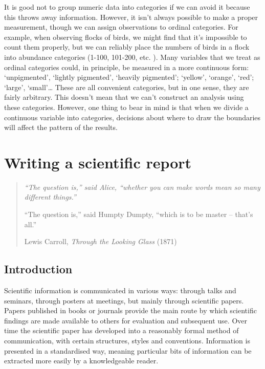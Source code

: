 \documentclass[
]{book}
\begin{document}
It is good not to group numeric data into categories if we can avoid it because this throws away information. However, it isn't always possible to make a proper measurement, though we can assign observations to ordinal categories. For example, when observing flocks of birds, we might find that it's impossible to count them properly, but we can reliably place the numbers of birds in a flock into abundance categories (1-100, 101-200, etc. ). Many variables that we treat as ordinal categories could, in principle, be measured in a more continuous form: `unpigmented', `lightly pigmented', `heavily pigmented'; `yellow', `orange', `red'; `large', `small'\ldots{} These are all convenient categories, but in one sense, they are fairly arbitrary. This doesn't mean that we can't construct an analysis using these categories. However, one thing to bear in mind is that when we divide a continuous variable into categories, decisions about where to draw the boundaries will affect the pattern of the results.

\hypertarget{writing-a-scientific-report}{%
\chapter{Writing a scientific report}\label{writing-a-scientific-report}}

\begin{quote}
\emph{``The question is,'' said Alice, ``whether you can make words mean so many different things.''}

``The question is,'' said Humpty Dumpty, ``which is to be master -- that's all.''

Lewis Carroll, \emph{Through the Looking Glass} (1871)
\end{quote}

\hypertarget{introduction-7}{%
\section{Introduction}\label{introduction-7}}

Scientific information is communicated in various ways: through talks and seminars, through posters at meetings, but mainly through scientific papers. Papers published in books or journals provide the main route by which scientific findings are made available to others for evaluation and subsequent use. Over time the scientific paper has developed into a reasonably formal method of communication, with certain structures, styles and conventions. Information is presented in a standardised way, meaning particular bits of information can be extracted more easily by a knowledgeable reader.
\end{document}
